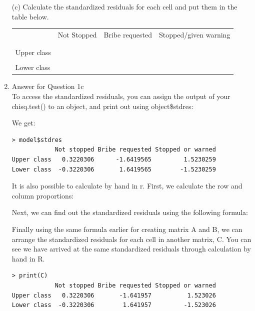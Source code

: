 \documentclass[12pt,letterpaper]{article}
\begin{document}
\begin{enumerate}
	\newpage
	\item [(c)] Calculate the standardized residuals for each cell and put them in the table below.
	\vspace{1cm}
	
	\begin{table}[h]
		\centering
		\begin{tabular}{l | c c c }
			& Not Stopped & Bribe requested & Stopped/given warning \\
			\\[-1.8ex] 
			\hline \\[-1.8ex]
			Upper class  &  &  &  \\
			\\
			Lower class &  &   &   \\
			
		\end{tabular}
	\end{table}
			\item
Answer for Question 1c\\
\noindent To access the standardized residuals, you can assign the output of your chisq.test() to an object, and print out using object\$stdres:\\
\vspace{.5cm}
  
\vspace{.5cm}
\noindent We get:\\
\begin{verbatim}
> model$stdres
            Not stopped Bribe requested Stopped or warned
Upper class   0.3220306      -1.6419565         1.5230259
Lower class  -0.3220306       1.6419565        -1.5230259
\end{verbatim}
\noindent It is also possible to calculate by hand in r. First, we calculate the row and column proportions:\\
\vspace{.5cm}
  
\vspace{.5cm}
\noindent Next, we can find out the standardized residuals using the following formula:\\
\vspace{.5cm}
  
\vspace{.5cm}
\noindent Finally using the same formula earlier for creating matrix A and B, we can arrange the standardized residuals for each cell in another matrix, C. You can see we have arrived at the same standardized residuals through calculation by hand in R.\\
\begin{verbatim}
> print(C)
            Not stopped Bribe requested Stopped or warned
Upper class   0.3220306       -1.641957          1.523026
Lower class  -0.3220306        1.641957         -1.523026
\end{verbatim}
	

\end{enumerate}
\end{document}
